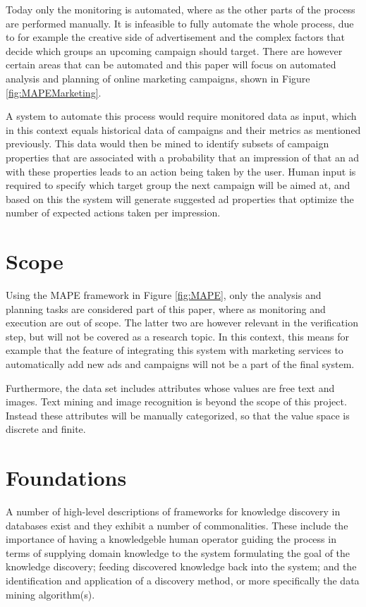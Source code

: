 \documentclass[a4paper]{article}
\begin{document}
Today only the monitoring is automated, where as the other parts of the process are performed manually. It is infeasible to fully
automate the whole process, due to for example the creative side of advertisement and the complex factors that decide which groups
an upcoming campaign should target. There are however certain areas that can be automated and this paper will focus on automated
analysis and planning of online marketing campaigns, shown in Figure \ref{fig:MAPEMarketing}.

A system to automate this process would require monitored data as input, which in this context equals historical data of campaigns
and their metrics as mentioned previously. This data would then be mined to identify subsets of campaign properties that are 
associated with a probability that an impression of that an ad with these properties leads to an action being taken by the user.
Human input is required to specify which target group the next campaign will be aimed at, and based on this the system will 
generate suggested ad properties that optimize the number of expected actions taken per impression.

\section{Scope}
Using the MAPE framework in Figure \ref{fig:MAPE}, only the analysis and planning tasks are considered part of this paper, where 
as monitoring and execution are out of scope. The latter two are however relevant in the verification step, but will not be 
covered as a research topic. In this context, this means for example that the feature of integrating this system with marketing 
services to automatically add new ads and campaigns will not be a part of the final system.

Furthermore, the data set includes attributes whose values are free text and images. Text mining and image recognition is beyond
the scope of this project. Instead these attributes will be manually categorized, so that the value space is discrete and finite.

\section{Foundations}
A number of high-level descriptions of frameworks for knowledge discovery in databases exist \citep{Fayyad1996, Frawley1992}
and they exhibit a number of commonalities. These include the importance of having a knowledgeble human operator guiding the
process in terms of supplying domain knowledge to the system formulating the goal of the knowledge discovery; feeding discovered
knowledge back into the system; and the identification and application of a discovery method, or more specifically the data mining
algorithm(s).
\end{document}

